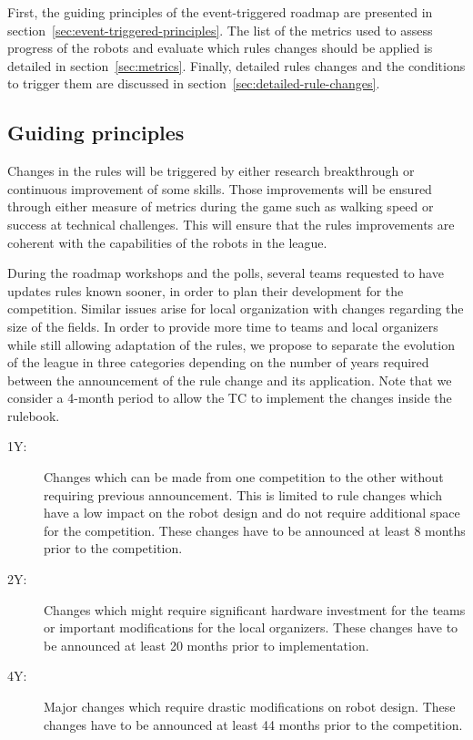 \documentclass{article}
\begin{document}
First, the guiding principles of the event-triggered roadmap are presented in
section~\ref{sec:event-triggered-principles}.
The list of the metrics used to assess progress of the robots and evaluate which
rules changes should be applied is detailed in section~\ref{sec:metrics}.
Finally, detailed rules changes and the conditions to trigger them are discussed
in section~\ref{sec:detailed-rule-changes}.

\subsection{\label{sec:event-triggered-principles}Guiding principles}

Changes in the rules will be triggered by either research breakthrough or
continuous improvement of some skills. Those improvements will be ensured
through either measure of metrics during the game such as walking speed or
success at technical challenges. This will ensure that the rules improvements
are coherent with the capabilities of the robots in the league.

During the roadmap workshops and the polls, several teams requested to have
updates rules known sooner, in order to plan their development for the
competition. Similar issues arise for local organization with changes regarding
the size of the fields. In order to provide more time to teams and local
organizers while still allowing adaptation of the rules, we propose to separate
the evolution of the league in three categories depending on the number of years
required between the announcement of the rule change and its application. Note that
we consider a 4-month period to allow the TC to implement the changes inside the
rulebook.
\begin{description}
\item[1Y:] Changes which can be made from one competition to the other without
  requiring previous announcement. This is limited to rule changes which have a
  low impact on the robot design and do not require additional space for the
  competition. These changes have to be announced at least 8 months prior
  to the competition.
\item[2Y:] Changes which might require significant hardware investment for the
  teams or important modifications for the local organizers. These changes have
  to be announced at least 20 months prior to implementation.
\item[4Y:] Major changes which require drastic modifications on robot design.
  These changes have to be announced at least 44 months prior to the
  competition.
\end{description}
\end{document}
